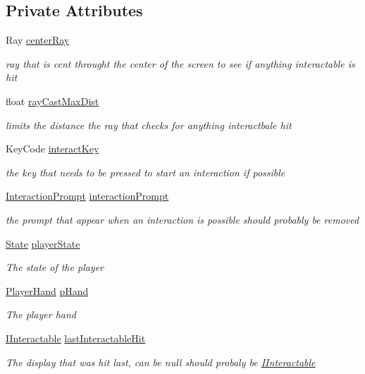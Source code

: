 \subsection*{Private Attributes}
\begin{DoxyCompactItemize}
\item 
Ray \mbox{\hyperlink{class_player_ae2a4edadae1e278ef28c3bb236e7af83}{center\+Ray}}
\begin{DoxyCompactList}\small\item\em ray that is cent throught the center of the screen to see if anything interactable is hit \end{DoxyCompactList}\item 
float \mbox{\hyperlink{class_player_a322b20647ba7b9c279006c4745f7eae9}{ray\+Cast\+Max\+Dist}}
\begin{DoxyCompactList}\small\item\em limits the distance the ray that checks for anything interactbale hit \end{DoxyCompactList}\item 
Key\+Code \mbox{\hyperlink{class_player_ad17e0e6b44972e1c99a08fbaa38b0672}{interact\+Key}}
\begin{DoxyCompactList}\small\item\em the key that needs to be pressed to start an interaction if possible \end{DoxyCompactList}\item 
\mbox{\hyperlink{class_interaction_prompt}{Interaction\+Prompt}} \mbox{\hyperlink{class_player_aa1545460a9996f71150823c51dc60ab5}{interaction\+Prompt}}
\begin{DoxyCompactList}\small\item\em the prompt that appear when an interaction is possible should probably be removed \end{DoxyCompactList}\item 
\mbox{\hyperlink{class_player_aa3b6104791d642173caf761cf81f8c08}{State}} \mbox{\hyperlink{class_player_a8b94069330ce05b42769d5cc61c6f00a}{player\+State}}
\begin{DoxyCompactList}\small\item\em The state of the player \end{DoxyCompactList}\item 
\mbox{\hyperlink{class_player_hand}{Player\+Hand}} \mbox{\hyperlink{class_player_a0b9d29fbeb7400d02b9bb148b2629f34}{p\+Hand}}
\begin{DoxyCompactList}\small\item\em The player hand \end{DoxyCompactList}\item 
\mbox{\hyperlink{interface_i_interactable}{I\+Interactable}} \mbox{\hyperlink{class_player_ac05f1557fc411c88274df512abb865ac}{last\+Interactable\+Hit}}
\begin{DoxyCompactList}\small\item\em The display that was hit last, can be null should probaly be \mbox{\hyperlink{interface_i_interactable}{I\+Interactable}} \end{DoxyCompactList}\end{DoxyCompactItemize}


